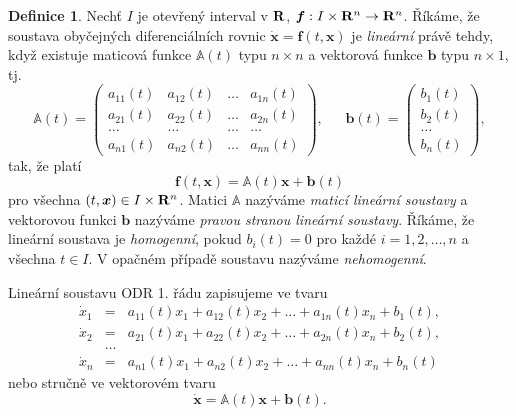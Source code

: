 \documentclass[a4paper, 12pt]{book}
\theoremstyle{definition}
\newtheorem{definition}[theorem]{Definice}
\def\to{\rightarrow}
\def\Real{{\rm\bf R}}
\def\vc#1{\mathbf{\boldsymbol{#1}}}     %
\def\tn#1{{\mathbb{#1}}}    %
\def\df#1{\emph{#1}}
\begin{document}
\begin{definition}
Nechť $I$ je otevřený interval v $\Real$, $\vc f: I\times \Real^n \to \Real^n$.
Říkáme, že soustava obyčejných diferenciálních rovnic 
$\dot{\vc x}=\vc f(t,\vc x)$ je \df{lineární} právě tehdy, když existuje maticová 
funkce $\tn A(t)$ typu $n\times n$ a vektorová funkce $\vc b$ typu $n\times 1$, tj.
\begin{equation}
{\tn A}(t) = \left(\begin{array}{rrrr}
a_{11}(t)&a_{12}(t)&\dots&a_{1n}(t)\\
a_{21}(t)&a_{22}(t)&\dots&a_{2n}(t)\\
\dots&\dots&\dots&\dots\\
a_{n1}(t)&a_{n2}(t)&\dots&a_{nn}(t)
\end{array}\right), ~~~~~~~
{\vc b}(t) = \left(\begin{array}{c}
b_1(t)\\ b_2(t)\\ \dots\\ b_n(t)
\end{array}\right),
\end{equation}
tak, že platí 
\begin{equation}
\vc f(t, \vc x)={\tn A}(t)\vc x+{\vc b}(t)
\end{equation}
pro všechna $(t,\vc x)\in I\times \Real^n$.
Matici $\tn A$ nazýváme \emph{maticí lineární soustavy} a vektorovou funkci 
$\vc b$ nazýváme \emph{pravou stranou lineární soustavy}. Říkáme, že lineární 
soustava je \emph{homogenní}, pokud $b_i(t)=0$ pro každé $i=1,2,\dots,n$ a 
všechna $t\in I$. V opačném případě soustavu nazýváme \emph{nehomogenní}.
\end{definition}

Lineární soustavu ODR 1. řádu zapisujeme ve tvaru
\begin{equation}
\begin{array}{rcl}
\dot x_1&=&a_{11}(t)x_1+a_{12}(t)x_2+\dots+a_{1n}(t)x_n+b_1(t),\\
\dot x_2&=&a_{21}(t)x_1+a_{22}(t)x_2+\dots+a_{2n}(t)x_n+b_2(t),\\
&\dots&\\
\dot x_n&=&a_{n1}(t)x_1+a_{n2}(t)x_2+\dots+a_{nn}(t)x_n+b_n(t)
\end{array}
\end{equation}
nebo stručně ve vektorovém tvaru
\begin{equation}
\label{eq:linODR}
\dot {\vc x}={\tn A}(t)\vc x+{\vc b}(t).
\end{equation}
\end{document}
